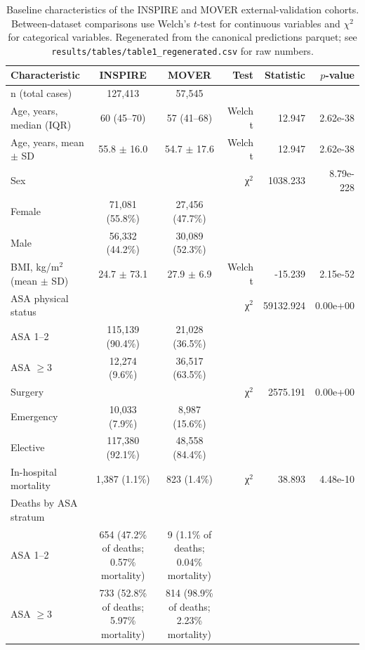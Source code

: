\begin{table}[h]
\centering
\caption{Baseline characteristics of the INSPIRE and MOVER external-validation cohorts. Between-dataset comparisons use Welch's $t$-test for continuous variables and $\chi^2$ for categorical variables. Regenerated from the canonical predictions parquet; see \texttt{results/tables/table1\_regenerated.csv} for raw numbers.}
\label{tab:table1}
\begin{tabular}{lccrrr}
\toprule
Characteristic & INSPIRE & MOVER & Test & Statistic & $p$-value \\
\midrule
n (total cases) & 127,413 & 57,545 &  &  &  \\
Age, years, median (IQR) & 60 (45--70) & 57 (41--68) & Welch t & 12.947 & 2.62e-38 \\
Age, years, mean $\pm$ SD & 55.8 $\pm$ 16.0 & 54.7 $\pm$ 17.6 & Welch t & 12.947 & 2.62e-38 \\
Sex &  &  & χ$^2$ & 1038.233 & 8.79e-228 \\
  Female & 71,081 (55.8\%) & 27,456 (47.7\%) &  &  &  \\
  Male & 56,332 (44.2\%) & 30,089 (52.3\%) &  &  &  \\
BMI, kg/m$^2$ (mean $\pm$ SD) & 24.7 $\pm$ 73.1 & 27.9 $\pm$ 6.9 & Welch t & -15.239 & 2.15e-52 \\
ASA physical status &  &  & χ$^2$ & 59132.924 & 0.00e+00 \\
  ASA 1--2 & 115,139 (90.4\%) & 21,028 (36.5\%) &  &  &  \\
  ASA $\geq$3 & 12,274 (9.6\%) & 36,517 (63.5\%) &  &  &  \\
Surgery &  &  & χ$^2$ & 2575.191 & 0.00e+00 \\
  Emergency & 10,033 (7.9\%) & 8,987 (15.6\%) &  &  &  \\
  Elective & 117,380 (92.1\%) & 48,558 (84.4\%) &  &  &  \\
In-hospital mortality & 1,387 (1.1\%) & 823 (1.4\%) & χ$^2$ & 38.893 & 4.48e-10 \\
Deaths by ASA stratum &  &  &  &  &  \\
  ASA 1--2 & 654 (47.2\% of deaths; 0.57\% mortality) & 9 (1.1\% of deaths; 0.04\% mortality) &  &  &  \\
  ASA $\geq$3 & 733 (52.8\% of deaths; 5.97\% mortality) & 814 (98.9\% of deaths; 2.23\% mortality) &  &  &  \\
\bottomrule
\end{tabular}
\end{table}
